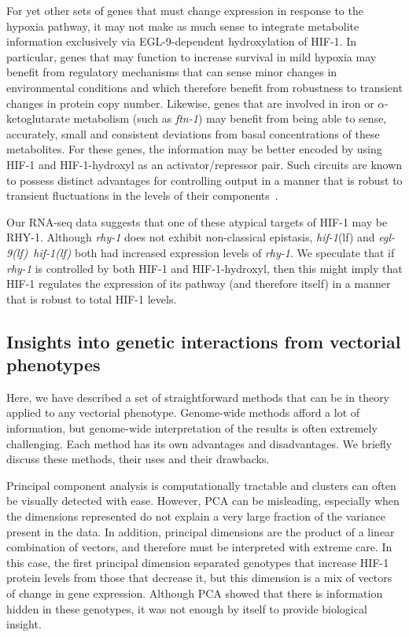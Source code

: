 \documentclass[9pt,twocolumn,twoside]{pnas-new}
\newcommand{\gene}[1]{\emph{#1}}
\newcommand{\ftna}{\emph{\mbox{ftn-1}}}
\newcommand{\eglhif}{\emph{\mbox{egl-9(lf)}~\mbox{hif-1(lf)}}}
\newcommand{\hif}{\emph{\mbox{hif-1}}(lf)}
\newcommand{\eglp}{EGL-9}
\newcommand{\rhyp}{RHY-1}
\newcommand{\hifp}{HIF-1}
\begin{document}
For yet other sets of genes that must change expression in response to the hypoxia
pathway, it may not make as much sense to integrate metabolite information
exclusively via \eglp{}-dependent hydroxylation of \hifp{}. In particular, genes
that may function to increase survival in mild hypoxia may benefit from regulatory
mechanisms that can sense minor changes in environmental conditions and which
therefore benefit from robustness to transient changes in protein copy number.
Likewise, genes that are involved in iron or $\alpha$-ketoglutarate metabolism
(such as \ftna{}) may benefit from being able to sense, accurately, small and
consistent deviations from basal concentrations of these metabolites. For these
genes, the information may be better encoded by using \hifp{} and
\hifp{}-hydroxyl as an activator/repressor pair. Such circuits are
known to possess distinct advantages for controlling output in a manner that
is robust to transient fluctuations in the levels of their
components~\cite{Hart2012,Hart2013}.

Our RNA-seq data suggests that one of these atypical targets of \hifp{}
may be \rhyp{}. Although \gene{rhy-1} does not exhibit non-classical
epistasis, \hif{} and \eglhif{} both had increased expression levels of \gene{rhy-1}.
We speculate that if \gene{rhy-1} is controlled by both \hifp{} and \hifp{}-hydroxyl,
then this might imply that \hifp{} regulates the expression of its pathway (and
therefore itself) in a manner that is robust to total \hifp{} levels.

\subsection*{Insights into genetic interactions from vectorial phenotypes}

Here, we have described a set of straightforward methods that can be in theory
applied to any vectorial phenotype. Genome-wide methods afford a lot of information,
but genome-wide interpretation of the results is often extremely challenging.
Each method has its own advantages and disadvantages. We briefly discuss these
methods, their uses and their drawbacks.

Principal component analysis
is computationally tractable and clusters can often be visually detected with
ease. However, PCA can be misleading, especially when the dimensions represented
do not explain a very large fraction of the variance present in the data. In addition,
principal dimensions are the product of a linear combination of vectors, and therefore
must be interpreted with extreme care. In this case, the first principal dimension
separated genotypes that increase \hifp{} protein levels from those that decrease
it, but this dimension is a mix of vectors of change in gene expression. Although
PCA showed that there is information hidden in these genotypes, it was not enough by
itself to provide biological insight.
\end{document}
